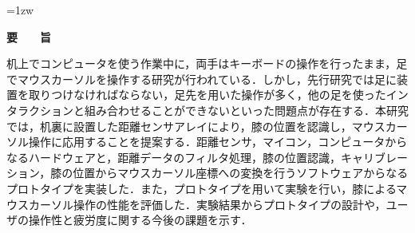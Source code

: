 \documentclass[a4paper,11pt]{jreport}
\author{市川　佑}
\begin{document}
\maketitle
\thispagestyle{empty}
\newpage

\thispagestyle{empty}
\vspace*{20pt plus 1fil}
\parindent=1zw
\noindent
\begin{center}
{\Large \bf 要　　旨}
\vspace{2cm}
\end{center}
机上でコンピュータを使う作業中に，両手はキーボードの操作を行ったまま，足でマウスカーソルを操作する研究が行われている．しかし，先行研究では足に装置を取りつけなければならない，足先を用いた操作が多く，他の足を使ったインタラクションと組み合わせることができないといった問題点が存在する．本研究では，机裏に設置した距離センサアレイにより，膝の位置を認識し，マウスカーソル操作に応用することを提案する．距離センサ，マイコン，コンピュータからなるハードウェアと，距離データのフィルタ処理，膝の位置認識，キャリブレーション，膝の位置からマウスカーソル座標への変換を行うソフトウェアからなるプロトタイプを実装した．また，プロトタイプを用いて実験を行い，膝によるマウスカーソル操作の性能を評価した．実験結果からプロトタイプの設計や，ユーザの操作性と疲労度に関する今後の課題を示す．

\par
\vspace{0pt plus 1fil}
\newpage

\tableofcontents
\listoffigures
\listoftables

\pagebreak \setcounter{page}{1}



%











\end{document}
